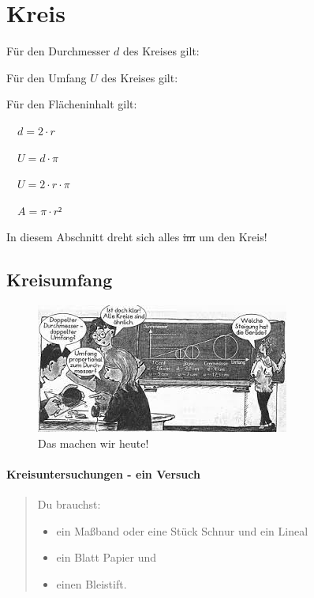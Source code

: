 \documentclass[
  ngerman,
]{book}
\providecommand{\tightlist}{%
  \setlength{\itemsep}{0pt}\setlength{\parskip}{0pt}}
\begin{document}
\hypertarget{section-23}{%
\subsubsection*{}\label{section-23}}

\hypertarget{kreis}{%
\chapter{Kreis}\label{kreis}}

Für den Durchmesser \(d\) des Kreises gilt:

Für den Umfang \(U\) des Kreises gilt:

Für den Flächeninhalt gilt:

\(\quad d=2\cdot r\)

\(\quad U= d \cdot \pi\)

\(\quad U = 2 \cdot r \cdot \pi\)

\(\quad A=\pi \cdot r²\)

In diesem Abschnitt dreht sich alles \sout{im} um den Kreis!

\hypertarget{kreisumfang}{%
\section*{Kreisumfang}\label{kreisumfang}}

\begin{figure}
\centering
\includegraphics{./Bilder/Umfang.jpeg}
\caption{Das machen wir heute!}
\end{figure}

\hypertarget{kreisuntersuchungen---ein-versuch}{%
\subsubsection*{Kreisuntersuchungen - ein Versuch}\label{kreisuntersuchungen---ein-versuch}}

\begin{quote}
Du brauchst:

\begin{itemize}
\tightlist
\item
  ein Maßband oder eine Stück Schnur und ein Lineal
\item
  ein Blatt Papier und
\item
  einen Bleistift.
\end{itemize}
\end{quote}
\end{document}
